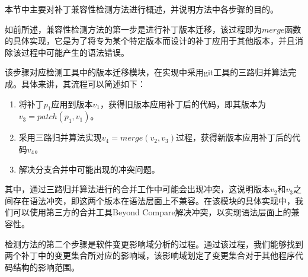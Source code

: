 
本节中主要对补丁兼容性检测方法进行概述，并说明方法中各步骤的目的。

如前所述，兼容性检测方法的第一步是进行补丁版本迁移，该过程即为$merge$函数的具体实现，它是为了将专为某个特定版本而设计的补丁应用于其他版本，并且消除该过程中可能产生的语法错误。

该步骤对应检测工具中的版本迁移模块，在实现中采用git工具的三路归并算法完成。具体来讲，其流程可以简述如下：
\begin{enumerate}
	\item 将补丁$p_1$应用到版本$v_1$，获得旧版本应用补丁后的代码，即其版本为$v_3 = patch(p_1,v_1)$。
	\item 采用三路归并算法实现$v_4 = merge(v_2,v_3)$过程，获得新版本应用补丁后的代码$v_4$。
	\item 解决分支合并中可能出现的冲突问题。
\end{enumerate}

其中，通过三路归并算法进行的合并工作中可能会出现冲突，这说明版本$v_2$和$v_3$之间存在语法冲突，即这两个版本在语法层面上不兼容。在该模块的具体实现中，我们可以使用第三方的合并工具Beyond Compare解决冲突，以实现语法层面上的兼容性。

%


检测方法的第二个步骤是软件变更影响域分析的过程。通过该过程，我们能够找到两个补丁中的变更集合所对应的影响域，该影响域划定了变更集合对于其他程序代码结构的影响范围。

